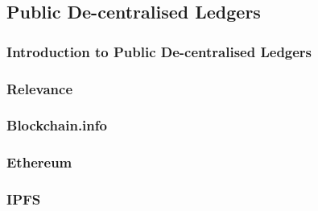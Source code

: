 \subsection{Public De-centralised Ledgers}

\subsubsection{Introduction to Public De-centralised Ledgers}

\subsubsection{Relevance}

\subsubsection{Blockchain.info}

\subsubsection{Ethereum}

\subsubsection{IPFS}

